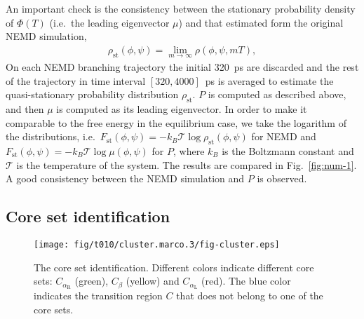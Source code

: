 \documentclass[aps, pre, preprint,unsortedaddress,a4paper,onecolumn,showkeys]{revtex4}
\newcommand{\mymu}{\mu}
\newcommand{\dih}{\textrm{dih}}
\newcommand{\confaa}[0]{{\alpha_{\textrm{R}}}}
\newcommand{\confc}[0]{{\alpha_{\textrm{L}}}}
\begin{document}
An important check is the consistency between the
stationary probability density of $\Phi(T)$ (i.e.~the leading eigenvector $\mymu$) and that 
estimated form the original NEMD simulation,
\begin{align}
  \label{eq:num-tmp1}
  \rho_{\textrm{st}}(\phi,\psi) = \lim_{m\rightarrow\infty} \rho (\phi,\psi,mT),
\end{align}
On each NEMD branching trajectory the initial 320~ps are discarded and
the rest of the trajectory in time interval $[320,4000]$~ps is averaged to estimate
the quasi-stationary probability distribution $\rho_{\textrm{st}}$. 
$P$ is computed as described above, and then $\mymu$ is computed as its leading eigenvector. In order to make it comparable to the free energy in the equilibrium case, we take
the logarithm of the distributions, i.e.~$F_{\textrm{st}}(\phi,\psi)=
-k_B\mathcal T\log \rho_{\textrm{st}}(\phi,\psi)$
for NEMD and $F_{\textrm{st}}(\phi,\psi)=
-k_B\mathcal T\log \mu(\phi,\psi)$ for $P$, where $k_B$ is the
Boltzmann constant and $\mathcal T$ is the temperature of the system.
The
results are  compared in Fig.~\ref{fig:num-1}. A good consistency between
the  NEMD simulation and 
$P$ is observed.  


\subsection{Core set identification}

\begin{figure}
  \centering
  \texttt{[image: fig/t010/cluster.marco.3/fig-cluster.eps]}
  \caption{The core set identification. Different colors indicate different core sets: $C_{\confaa}$ (green), $C_\beta$ (yellow) and $C_{\confc}$ (red).
    The blue color indicates the transition region $C$ that does not belong to one of the core sets.}
  \label{fig:cluster}
\end{figure}
\end{document}
